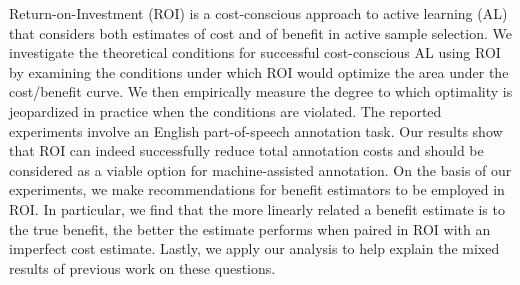 Return-on-Investment (ROI) is a cost-conscious approach to active learning (AL) that considers both estimates of cost and of benefit in active sample selection. We investigate the theoretical conditions for successful cost-conscious AL using ROI by examining the conditions under which ROI would optimize the area under the cost/benefit curve. We then empirically measure the degree to which optimality is jeopardized in practice when the conditions are violated. The reported experiments involve an English part-of-speech annotation task. Our results show that ROI can indeed successfully reduce total annotation costs and should be considered as a viable option for machine-assisted annotation. On the basis of our experiments, we make recommendations for benefit estimators to be employed in ROI. In particular, we find that the more linearly related a benefit estimate is to the true benefit, the better the estimate performs when paired in ROI with an imperfect cost estimate. Lastly, we apply our analysis to help explain the mixed results of previous work on these questions.
